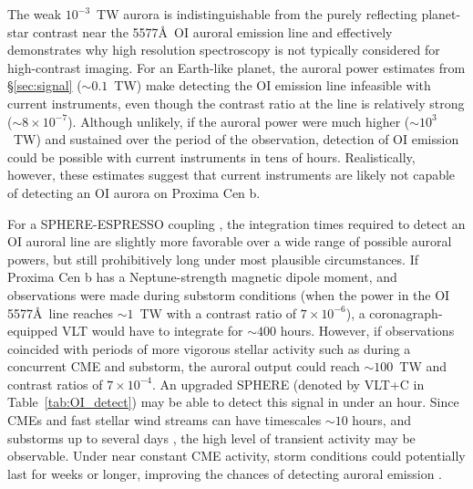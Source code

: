 \documentclass{emulateapj}
\newcommand{\XXX}[1]{#1}      %
\begin{document}
The weak $10^{-3}$~TW aurora is indistinguishable from the purely reflecting planet-star contrast near the 5577\AA\ OI auroral emission line \citep{Turbet2016,Meadows2016} and effectively demonstrates why high resolution spectroscopy is not typically considered for high-contrast imaging. %
For an Earth-like planet, the auroral power estimates from \S\ref{sec:signal} (${\sim} 0.1$~TW) make detecting the OI emission line infeasible with current instruments, even though the contrast ratio at the line is relatively strong (${\sim}8 \times 10^{-7}$). %
Although unlikely, if the auroral power were much higher (${\sim} 10^{3}$~TW) and sustained over the period of the observation, detection of OI emission could be possible with current instruments in tens of hours. %
Realistically, however, these estimates suggest that current instruments are likely not capable of detecting an OI aurora on Proxima Cen b.

For a SPHERE-ESPRESSO coupling \citep{Lovis2016}, the integration times required to detect an OI auroral line are slightly more favorable over a wide range of possible auroral powers, but still prohibitively long under most plausible circumstances. If Proxima Cen b has a Neptune-strength magnetic dipole moment, and observations were made during substorm conditions (when the power in the OI 5577\AA\ line reaches ${\sim} 1$~TW with a contrast ratio of $7 \times 10^{-6}$), a coronagraph-equipped VLT would have to integrate for ${\sim} 400$ hours. However, if observations coincided with periods of more vigorous stellar activity such as during a concurrent CME and substorm, the auroral output could reach ${\sim} 100$~TW and contrast ratios of $7 \times 10^{-4}$.  An upgraded SPHERE \XXX{(denoted by VLT+C in Table~\ref{tab:OI_detect})} may be able to detect this signal in under an hour. Since CMEs and fast stellar wind streams can have timescales ${\sim} 10$ hours, and substorms up to several days \citep{Gonzalez1994,Gonzalez1999}, the high level of transient activity may be observable.  Under near constant CME activity, storm conditions could potentially last for weeks or longer, improving the chances of detecting auroral emission  \citep{Khodachenko2007}.
\end{document}
